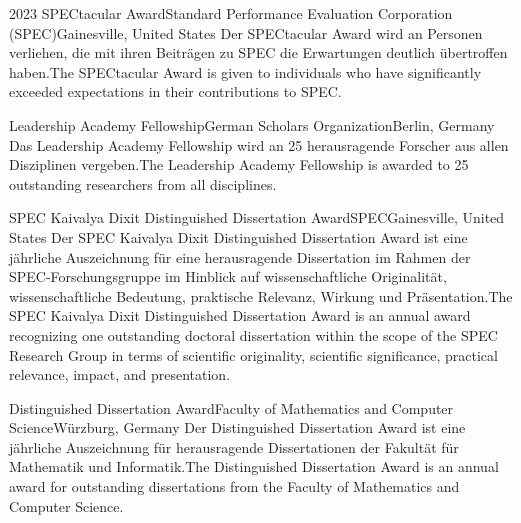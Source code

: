 
\begin{cventries}

    {2023 SPECtacular Award}{Standard Performance Evaluation Corporation (SPEC)}{Gainesville, United States}%
    {} %
    {Der SPECtacular Award wird an Personen verliehen, die mit ihren Beiträgen zu SPEC die Erwartungen deutlich übertroffen haben.}{The SPECtacular Award is given to individuals who have significantly exceeded expectations in their contributions to SPEC.}

	{Leadership Academy Fellowship}{German Scholars Organization}{Berlin, Germany}%
    {}%
    {Das Leadership Academy Fellowship wird an 25 herausragende Forscher aus allen Disziplinen vergeben.}{The Leadership Academy Fellowship is awarded to 25 outstanding researchers from all disciplines.}

	{SPEC Kaivalya Dixit Distinguished Dissertation Award}{SPEC}{Gainesville, United States}%
    {}%
    {Der SPEC Kaivalya Dixit Distinguished Dissertation Award ist eine jährliche Auszeichnung für eine herausragende Dissertation im Rahmen der SPEC-Forschungsgruppe im Hinblick auf wissenschaftliche Originalität, wissenschaftliche Bedeutung, praktische Relevanz, Wirkung und Präsentation.}{The SPEC Kaivalya Dixit Distinguished Dissertation Award is an annual award recognizing one outstanding doctoral dissertation within the scope of the SPEC Research Group in terms of scientific originality, scientific significance, practical relevance, impact, and presentation.}

	{Distinguished Dissertation Award}{Faculty of Mathematics and Computer Science}{Würzburg, Germany}%
    {}%
    {Der Distinguished Dissertation Award ist eine jährliche Auszeichnung für herausragende Dissertationen der Fakultät für Mathematik und Informatik.}{The Distinguished Dissertation Award is an annual award for outstanding dissertations from the Faculty of Mathematics and Computer Science.}


\end{cventries}
